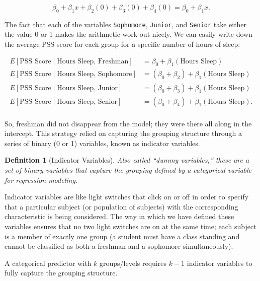 \documentclass[
]{book}
\theoremstyle{plain}
\theoremstyle{mydefn}
\newtheorem{definition}{Definition}[chapter]
\theoremstyle{myexmpl}
\theoremstyle{remark}
\begin{document}
\[\beta_0 + \beta_1 x + \beta_2 (0) + \beta_3 (0) + \beta_4 (0) = \beta_0 + \beta_1 x.\]

The fact that each of the variables \texttt{Sophomore}, \texttt{Junior}, and \texttt{Senior} take either the value 0 or 1 makes the arithmetic work out nicely. We can easily write down the average PSS score for each group for a specific number of hours of sleep:

\[
\begin{aligned}
  E\left[\text{PSS Score} \mid \text{Hours Sleep, Freshman}\right]
    &= \beta_0 + \beta_1 (\text{Hours Sleep}) \\
  E\left[\text{PSS Score} \mid \text{Hours Sleep, Sophomore}\right]
    &= \left(\beta_0 + \beta_2\right) + \beta_1 (\text{Hours Sleep})\\
  E\left[\text{PSS Score} \mid \text{Hours Sleep, Junior}\right]
    &= \left(\beta_0 + \beta_3\right) + \beta_1 (\text{Hours Sleep}) \\
  E\left[\text{PSS Score} \mid \text{Hours Sleep, Senior}\right]
    &= \left(\beta_0 + \beta_4\right) + \beta_1 (\text{Hours Sleep}). \\
\end{aligned}
\]

So, freshman did not disappear from the model; they were there all along in the intercept. This strategy relied on capturing the grouping structure through a series of binary (0 or 1) variables, known as indicator variables.

\begin{definition}[Indicator Variables]
Also called ``dummy variables,'' these are a set of binary variables that capture the grouping defined by a categorical variable for regression modeling.
\end{definition}

Indicator variables are like light switches that click on or off in order to specify that a particular subject (or population of subjects) with the corresponding characteristic is being considered. The way in which we have defined these variables ensures that no two light switches are on at the same time; each subject is a member of exactly one group (a student must have a class standing and cannot be classified as both a freshman and a sophomore simultaneously).

\begin{rmdtip}
A categorical predictor with \(k\) groups/levels requires \(k-1\) indicator variables to fully capture the grouping structure.
\end{rmdtip}
\end{document}

